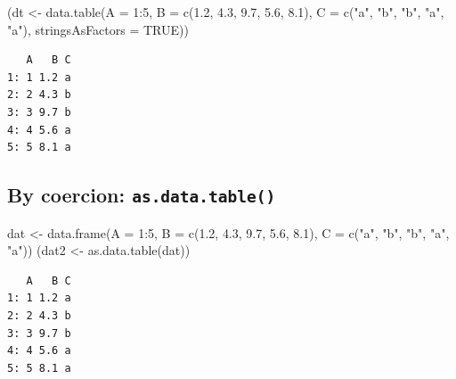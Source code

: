 \documentclass[
]{book}
\newenvironment{Shaded}{\begin{snugshade}}{\end{snugshade}}
\newcommand{\AttributeTok}[1]{\textcolor[rgb]{0.77,0.63,0.00}{#1}}
\newcommand{\ConstantTok}[1]{\textcolor[rgb]{0.00,0.00,0.00}{#1}}
\newcommand{\DecValTok}[1]{\textcolor[rgb]{0.00,0.00,0.81}{#1}}
\newcommand{\FloatTok}[1]{\textcolor[rgb]{0.00,0.00,0.81}{#1}}
\newcommand{\FunctionTok}[1]{\textcolor[rgb]{0.00,0.00,0.00}{#1}}
\newcommand{\NormalTok}[1]{#1}
\newcommand{\OtherTok}[1]{\textcolor[rgb]{0.56,0.35,0.01}{#1}}
\newcommand{\SpecialCharTok}[1]{\textcolor[rgb]{0.00,0.00,0.00}{#1}}
\newcommand{\StringTok}[1]{\textcolor[rgb]{0.31,0.60,0.02}{#1}}
\begin{document}
\begin{Shaded}
\begin{Highlighting}[]
\NormalTok{(dt }\OtherTok{\textless{}{-}} \FunctionTok{data.table}\NormalTok{(}\AttributeTok{A =} \DecValTok{1}\SpecialCharTok{:}\DecValTok{5}\NormalTok{,}
                  \AttributeTok{B =} \FunctionTok{c}\NormalTok{(}\FloatTok{1.2}\NormalTok{, }\FloatTok{4.3}\NormalTok{, }\FloatTok{9.7}\NormalTok{, }\FloatTok{5.6}\NormalTok{, }\FloatTok{8.1}\NormalTok{),}
                  \AttributeTok{C =} \FunctionTok{c}\NormalTok{(}\StringTok{"a"}\NormalTok{, }\StringTok{"b"}\NormalTok{, }\StringTok{"b"}\NormalTok{, }\StringTok{"a"}\NormalTok{, }\StringTok{"a"}\NormalTok{),}
                  \AttributeTok{stringsAsFactors =} \ConstantTok{TRUE}\NormalTok{))}
\end{Highlighting}
\end{Shaded}

\begin{verbatim}
   A   B C
1: 1 1.2 a
2: 2 4.3 b
3: 3 9.7 b
4: 4 5.6 a
5: 5 8.1 a
\end{verbatim}

\hypertarget{by-coercion-as.data.table}{%
\subsection{\texorpdfstring{By coercion: \texttt{as.data.table()}}{By coercion: as.data.table()}}\label{by-coercion-as.data.table}}

\begin{Shaded}
\begin{Highlighting}[]
\NormalTok{dat }\OtherTok{\textless{}{-}} \FunctionTok{data.frame}\NormalTok{(}\AttributeTok{A =} \DecValTok{1}\SpecialCharTok{:}\DecValTok{5}\NormalTok{,}
                  \AttributeTok{B =} \FunctionTok{c}\NormalTok{(}\FloatTok{1.2}\NormalTok{, }\FloatTok{4.3}\NormalTok{, }\FloatTok{9.7}\NormalTok{, }\FloatTok{5.6}\NormalTok{, }\FloatTok{8.1}\NormalTok{),}
                  \AttributeTok{C =} \FunctionTok{c}\NormalTok{(}\StringTok{"a"}\NormalTok{, }\StringTok{"b"}\NormalTok{, }\StringTok{"b"}\NormalTok{, }\StringTok{"a"}\NormalTok{, }\StringTok{"a"}\NormalTok{))}
\NormalTok{(dat2 }\OtherTok{\textless{}{-}} \FunctionTok{as.data.table}\NormalTok{(dat))}
\end{Highlighting}
\end{Shaded}

\begin{verbatim}
   A   B C
1: 1 1.2 a
2: 2 4.3 b
3: 3 9.7 b
4: 4 5.6 a
5: 5 8.1 a
\end{verbatim}
\end{document}
